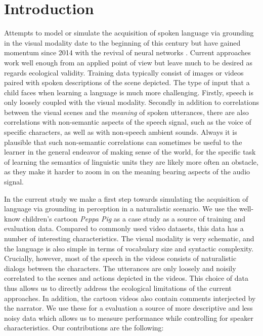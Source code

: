 \section{Introduction}
\label{sec:intro}

Attempts to model or simulate the acquisition of spoken language via
grounding in the visual modality date to the beginning of this century
\citep{roypentland2002learning} but have gained momentum since 2014
with the revival of neural networks
\citep[e.g.][]{synnaeve2014learning,harwath2015deep,
  harwath2016unsupervised,chrupala-etal-2017-representations,alishahi-etal-2017-encoding,harwath2018jointly,Merkx2019,havard2019models,rouditchenko2020avlnet,khorrami_2021,peng2021fastslow}.
Current approaches work well enough from an applied point of view but
leave much to be desired as regards ecological validity. Training data
typically consist of images or videos paired with spoken descriptions
of the scene depicted. The type of input that a child faces when
learning a language is much more challenging.  Firstly, speech is only
loosely coupled with the visual modality. Secondly in addition to
correlations between the visual scenes and the {\it meaning} of spoken
utterances, there are also correlations with non-semantic aspects of
the speech signal, such as the voice of specific characters, as well
as with non-speech ambient sounds. Always it is plausible that such
non-semantic correlations can sometimes be useful to the learner in
the general endeavor of making sense of the world, for the specific
task of learning the semantics of linguistic units they are likely more
often an obstacle, as they make it harder to zoom in on the meaning
bearing aspects of the audio signal.

In the current study we make a first step towards simulating the
acquisition of language via grounding in perception in a naturalistic
scenario.  We use the well-know children's cartoon {\it Peppa Pig} as
a case study as a source of training and evaluation data. Compared to
commonly used video datasets, this data has a number of interesting
characteristics.  The visual modality is very schematic, and the
language is also simple in terms of vocabulary size and syntactic
complexity. Crucially, however, most of the speech in the videos
consists of naturalistic dialogs between the characters. The
utterances are only loosely and noisily correlated to the scenes and
actions depicted in the videos. This choice of data thus allows us to
directly address the ecological limitations of the current
approaches. In addition, the cartoon videos also contain comments
interjected by the narrator. We use these for a evaluation a source of
more descriptive and less noisy data which allows us to measure
performance while controlling for speaker characteristics.
Our contributions are the following:

